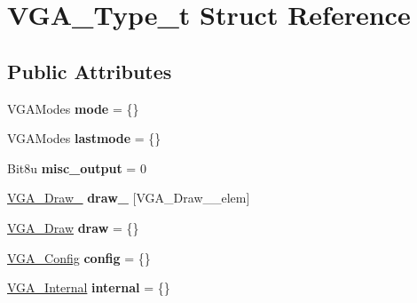 \hypertarget{structVGA__Type__t}{\section{V\-G\-A\-\_\-\-Type\-\_\-t Struct Reference}
\label{structVGA__Type__t}
}
\subsection*{Public Attributes}
\begin{DoxyCompactItemize}
\item 
\hypertarget{structVGA__Type__t_a52f3f75cc4cf9765990bf8904ce645ba}{V\-G\-A\-Modes {\bfseries mode} = \{\}}\label{structVGA__Type__t_a52f3f75cc4cf9765990bf8904ce645ba}

\item 
\hypertarget{structVGA__Type__t_ae5c20987070725f26a5254e445bb3570}{V\-G\-A\-Modes {\bfseries lastmode} = \{\}}\label{structVGA__Type__t_ae5c20987070725f26a5254e445bb3570}

\item 
\hypertarget{structVGA__Type__t_abf262974b9daa194a851bf860fa37ffa}{Bit8u {\bfseries misc\-\_\-output} = 0}\label{structVGA__Type__t_abf262974b9daa194a851bf860fa37ffa}

\item 
\hypertarget{structVGA__Type__t_accf8850b777f3723325ee9220c785dce}{\hyperlink{structVGA__Experimental__Model__1__t}{V\-G\-A\-\_\-\-Draw\-\_} {\bfseries draw\-\_} \mbox{[}V\-G\-A\-\_\-\-Draw\-\_\-\_\-elem\mbox{]}}\label{structVGA__Type__t_accf8850b777f3723325ee9220c785dce}

\item 
\hypertarget{structVGA__Type__t_aa4ed02fe9058d07c315090d94d5acee6}{\hyperlink{structVGA__Draw}{V\-G\-A\-\_\-\-Draw} {\bfseries draw} = \{\}}\label{structVGA__Type__t_aa4ed02fe9058d07c315090d94d5acee6}

\item 
\hypertarget{structVGA__Type__t_aefb9d6f51b743c06360075df37f8b711}{\hyperlink{structVGA__Config}{V\-G\-A\-\_\-\-Config} {\bfseries config} = \{\}}\label{structVGA__Type__t_aefb9d6f51b743c06360075df37f8b711}

\item 
\hypertarget{structVGA__Type__t_a1bb5027f230b8c1428656df73affeabe}{\hyperlink{structVGA__Internal}{V\-G\-A\-\_\-\-Internal} {\bfseries internal} = \{\}}\label{structVGA__Type__t_a1bb5027f230b8c1428656df73affeabe}


\end{DoxyCompactItemize}
